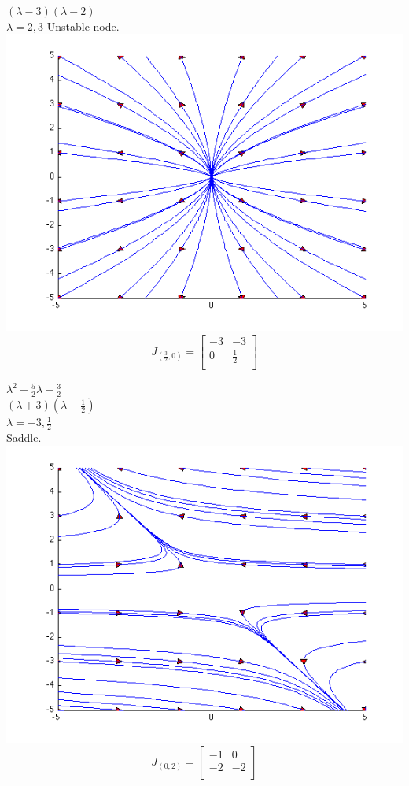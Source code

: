 \documentclass[12pt]{article}
\begin{document}
\((\lambda-3)(\lambda-2)\)\\
\(\lambda=2,3\)
Unstable node.\\
\includegraphics[scale=.5]{6-4-3a.png}
\newpage
\begin{displaymath}
  J_{(\frac{3}{2},0)} = \left[
  \begin{array}{cc}
    -3 & -3\\
    0 & \frac{1}{2}\\
    \end{array}
  \right]
\end{displaymath}

\(\lambda^2 + \frac{5}{2}\lambda -\frac{3}{2}\)\\
\((\lambda + 3)(\lambda - \frac{1}{2})\)\\
\(\lambda = -3,\frac{1}{2}\)\\
Saddle.\\

\includegraphics[scale=.5]{6-4-3b.png}
\newpage
\begin{displaymath}
  J_{(0,2)} = \left[
  \begin{array}{cc}
    -1 & 0\\
    -2 & -2\\
    \end{array}
  \right]
\end{displaymath}
\end{document}
